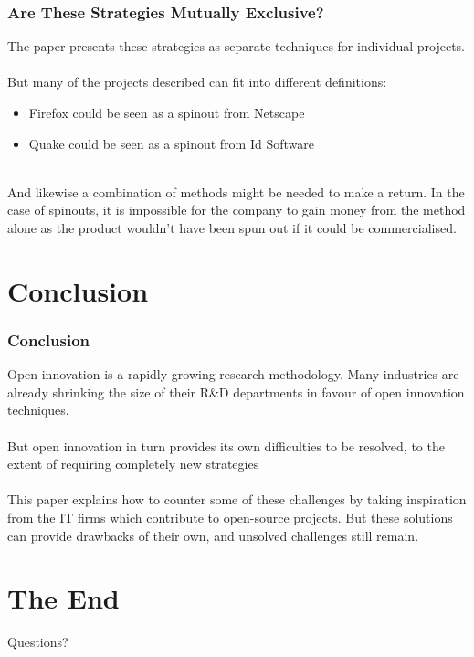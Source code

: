 \documentclass{beamer}
\begin{document}

\begin{frame}
\frametitle{Are These Strategies Mutually Exclusive?}
The paper presents these strategies as separate techniques for individual projects.\\~\\

But many of the projects described can fit into different definitions:
\begin{itemize}
\item Firefox could be seen as a spinout from Netscape
\item Quake could be seen as a spinout from Id Software
\end{itemize}

~\\And likewise a combination of methods might be needed to make a return. In the case of spinouts, it is impossible for the company to gain money from the method alone as the product wouldn't have been spun out if it could be commercialised.
\end{frame}

\section{Conclusion}

\begin{frame}
\frametitle{Conclusion}
Open innovation is a rapidly growing research methodology. Many industries are already shrinking the size of their R\&D departments in favour of open innovation techniques.\\~\\

But open innovation in turn provides its own difficulties to be resolved, to the extent of requiring completely new strategies \\~\\

This paper explains how to counter some of these challenges by taking inspiration from the IT firms which contribute to open-source projects. But these solutions can provide drawbacks of their own, and unsolved challenges still remain.
\end{frame}

\section{The End}

\begin{frame}
\Huge{\centerline{Questions?}}
\end{frame}

\end{document}
